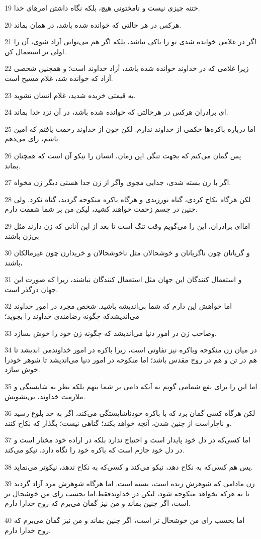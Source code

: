 \par 19 ختنه چیزی نیست و نامختونی هیچ، بلکه نگاه داشتن امرهای خدا.
\par 20 هرکس در هر حالتی که خوانده شده باشد، در همان بماند.
\par 21 اگر در غلامی خوانده شدی تو را باکی نباشد، بلکه اگر هم می‌توانی آزاد شوی، آن را اولی تر استعمال کن.
\par 22 زیرا غلامی که در خداوند خوانده شده باشد، آزاد خداوند است؛ و همچنین شخصی آزاد که خوانده شد، غلام مسیح است.
\par 23 به قیمتی خریده شدید، غلام انسان نشوید.
\par 24 ‌ای برادران هرکس در هرحالتی که خوانده شده باشد، در آن نزد خدا بماند.
\par 25 اما درباره باکره‌ها حکمی از خداوند ندارم. لکن چون از خداوند رحمت یافتم که امین باشم، رای می‌دهم.
\par 26 پس گمان می‌کنم که بجهت تنگی این زمان، انسان را نیکو آن است که همچنان بماند.
\par 27 اگر با زن بسته شدی، جدایی مجوی واگر از زن جدا هستی دیگر زن مخواه.
\par 28 لکن هرگاه نکاح کردی، گناه نورزیدی و هرگاه باکره منکوحه گردید، گناه نکرد. ولی چنین در جسم زحمت خواهند کشید، لیکن من بر شما شفقت دارم.
\par 29 اما‌ای برادران، این را می‌گویم وقت تنگ است تا بعد از این آنانی که زن دارند مثل بی‌زن باشند
\par 30 و گریانان چون ناگریانان و خوشحالان مثل ناخوشحالان و خریدارن چون غیرمالکان باشند،
\par 31 و استعمال کنندگان این جهان مثل استعمال کنندگان نباشند، زیرا که صورت این جهان درگذر است.
\par 32 اما خواهش این دارم که شما بی‌اندیشه باشید. شخص مجرد در امور خداوند می‌اندیشدکه چگونه رضامندی خداوند را بجوید؛
\par 33 وصاحب زن در امور دنیا می‌اندیشد که چگونه زن خود را خوش بسازد.
\par 34 در میان زن منکوحه وباکره نیز تفاوتی است، زیرا باکره در امور خداوندمی اندیشد تا هم در تن و هم در روح مقدس باشد؛ اما منکوحه در امور دنیا می‌اندیشد تا شوهر خودرا خوش سازد.
\par 35 اما این را برای نفع شمامی گویم نه آنکه دامی بر شما بنهم بلکه نظر به شایستگی و ملازمت خداوند، بی‌تشویش.
\par 36 لکن هرگاه کسی گمان برد که با باکره خودناشایستگی می‌کند، اگر به حد بلوغ رسید و ناچاراست از چنین شدن، آنچه خواهد بکند؛ گناهی نیست؛ بگذار که نکاح کنند.
\par 37 اما کسی‌که در دل خود پایدار است و احتیاج ندارد بلکه در اراده خود مختار است و در دل خود جازم است که باکره خود را نگاه دارد، نیکو می‌کند.
\par 38 پس هم کسی‌که به نکاح دهد، نیکو می‌کند و کسی‌که به نکاح ندهد، نیکوتر می‌نماید.
\par 39 زن مادامی که شوهرش زنده است، بسته است. اما هرگاه شوهرش مرد آزاد گردید تا به هرکه بخواهد منکوحه شود، لیکن در خداوندفقط.اما بحسب رای من خوشحال تر است، اگر چنین بماند و من نیز گمان می‌برم که روح خدارا دارم.
\par 40 اما بحسب رای من خوشحال تر است، اگر چنین بماند و من نیز گمان می‌برم که روح خدارا دارم.

